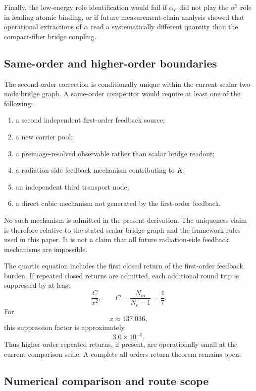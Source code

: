Finally, the low-energy role identification would fail if \(\alpha_F\)
did not play the \(\alpha^2\) role in leading atomic binding, or if
future measurement-chain analysis showed that operational extractions of
\(\alpha\) read a systematically different quantity than the
compact-fiber bridge coupling.

\subsection{Same-order and higher-order boundaries}

The second-order correction is conditionally unique within the current
scalar two-node bridge graph. A same-order competitor would require at
least one of the following:
\begin{enumerate}[label=(\arabic*)]
\item a second independent first-order feedback source;
\item a new carrier pool;
\item a preimage-resolved observable rather than scalar bridge readout;
\item a radiation-side feedback mechanism contributing to \(K\);
\item an independent third transport node;
\item a direct cubic mechanism not generated by the first-order feedback.
\end{enumerate}

No such mechanism is admitted in the present derivation. The uniqueness
claim is therefore relative to the stated scalar bridge graph and the
framework rules used in this paper. It is not a claim that all future
radiation-side feedback mechanisms are impossible.

The quartic equation includes the first closed return of the first-order
feedback burden. If repeated closed returns are admitted, each additional
round trip is suppressed by at least
\[
\frac{C}{x^2},
\qquad
C=\frac{N_m}{N_e-1}=\frac{4}{7}.
\]
For
\[
x\approx137.036,
\]
this suppression factor is approximately
\[
3.0\times10^{-5}.
\]
Thus higher-order repeated returns, if present, are operationally small
at the current comparison scale. A complete all-orders return theorem
remains open.

\subsection{Numerical comparison and route scope}

